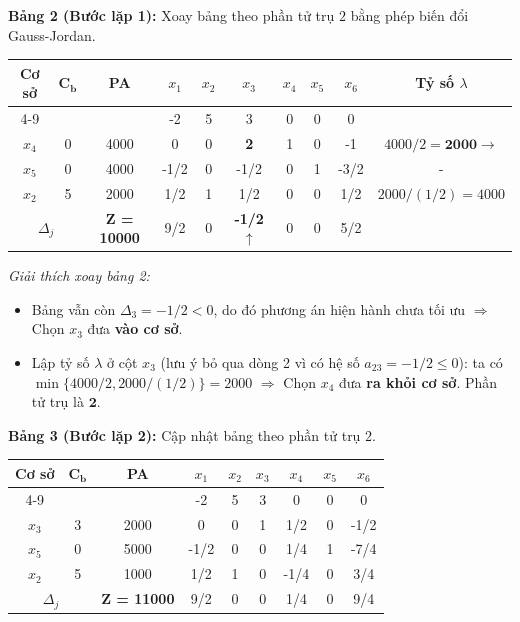 \vspace{0.3cm}
\textbf{Bảng 2 (Bước lặp 1):} Xoay bảng theo phần tử trụ $2$ bằng phép biến đổi Gauss-Jordan.
\begin{table}[H]
    \centering
    \renewcommand{\arraystretch}{1.3}
    \begin{tabular}{|c|c|c|c|c|c|c|c|c|c|}
        \hline
        \multirow{2}{*}{\textbf{Cơ sở}} & \multirow{2}{*}{$\mathbf{C_b}$} & \multirow{2}{*}{\textbf{PA}} & $x_1$ & $x_2$ & $x_3$ & $x_4$ & $x_5$ & $x_6$ & \multirow{2}{*}{\textbf{Tỷ số $\lambda$}} \\
        \cline{4-9}
        & & & -2 & 5 & 3 & 0 & 0 & 0 & \\
        \hline
        $x_4$ & 0 & 4000 & 0 & 0 & \textbf{2} & 1 & 0 & -1 & $4000 / 2 = \mathbf{2000} \rightarrow$ \\
        \hline
        $x_5$ & 0 & 4000 & -1/2 & 0 & -1/2 & 0 & 1 & -3/2 & - \\
        \hline
        $x_2$ & 5 & 2000 & 1/2 & 1 & 1/2 & 0 & 0 & 1/2 & $2000 / (1/2) = 4000$ \\
        \hline
        \multicolumn{2}{|c|}{$\Delta_j$} & \textbf{Z = 10000} & 9/2 & 0 & \textbf{-1/2} $\uparrow$ & 0 & 0 & 5/2 & \\
        \hline
    \end{tabular}
\end{table}
\textit{Giải thích xoay bảng 2:}
\begin{itemize}[itemsep=0pt, parsep=0pt, topsep=0pt]
    \item Bảng vẫn còn $\Delta_3 = -1/2 < 0$, do đó phương án hiện hành chưa tối ưu $\Rightarrow$ Chọn $x_3$ đưa \textbf{vào cơ sở}.
    \item Lập tỷ số $\lambda$ ở cột $x_3$ (lưu ý bỏ qua dòng 2 vì có hệ số $a_{23} = -1/2 \le 0$): ta có $\min\{4000/2, 2000/(1/2)\} = 2000$ $\Rightarrow$ Chọn $x_4$ đưa \textbf{ra khỏi cơ sở}. Phần tử trụ là $\mathbf{2}$.
\end{itemize}

\vspace{0.3cm}
\textbf{Bảng 3 (Bước lặp 2):} Cập nhật bảng theo phần tử trụ $2$.
\begin{table}[H]
    \centering
    \renewcommand{\arraystretch}{1.3}
    \begin{tabular}{|c|c|c|c|c|c|c|c|c|}
        \hline
        \multirow{2}{*}{\textbf{Cơ sở}} & \multirow{2}{*}{$\mathbf{C_b}$} & \multirow{2}{*}{\textbf{PA}} & $x_1$ & $x_2$ & $x_3$ & $x_4$ & $x_5$ & $x_6$ \\
        \cline{4-9}
        & & & -2 & 5 & 3 & 0 & 0 & 0 \\
        \hline
        $x_3$ & 3 & 2000 & 0 & 0 & 1 & 1/2 & 0 & -1/2 \\
        \hline
        $x_5$ & 0 & 5000 & -1/2 & 0 & 0 & 1/4 & 1 & -7/4 \\
        \hline
        $x_2$ & 5 & 1000 & 1/2 & 1 & 0 & -1/4 & 0 & 3/4 \\
        \hline
        \multicolumn{2}{|c|}{$\Delta_j$} & \textbf{Z = 11000} & 9/2 & 0 & 0 & 1/4 & 0 & 9/4 \\
        \hline
    \end{tabular}
\end{table}

